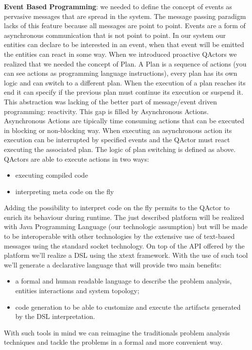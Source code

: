 \textbf{Event Based Programming}: we needed to define the concept of events as pervasive messages that are spread in the system. The message passing paradigm
lacks of this feature because all messages are point to point. Events are a form
of asynchronous communication that is not point to point. In our system our
entities can declare to be interested in an event, when that event will be emitted
the entities can react in some way.
When we introduced proactive QActors we realized that we needed the concept
of Plan. A Plan is a sequence of actions (you can see actions as programming
language instructions), every plan has its own logic and can switch to a different
plan. When the execution of a plan reaches its end it can specify if the
previous plan must continue its execution or suspend it. This abstraction was
lacking of the better part of message/event driven programming: reactivity. This
gap is filled by Asynchronous Actions. Asynchronous Actions are tipically time
consuming actions that can be executed in blocking or non-blocking way. When
executing an asynchronous action its execution can be interrupted by specified
events and the QActor must react executing the associated plan. The logic of
plan switching is defined as above. QActors are able to execute actions in two
ways:
\begin{itemize}
	\item executing compiled code
	\item interpreting meta code on the fly
\end{itemize} 
Adding the possibility to interpret code on the fly permits to the QActor to enrich
its behaviour during runtime. The just described platform will be realized with
Java Programming Language (our technologic assumption) but will be made
to be interoperable with other technologies by the extensive use of text-based
messages using the standard socket technology.
On top of the API offered by the platform we’ll realize a DSL using the xtext
framework. With the use of such tool we’ll generate a declarative language that
will provide two main benefits:
\begin{itemize}
	\item a formal and human readable language to describe the problem analysis,
	entities interactions and system topology;
	\item code generation to be able to customize and execute the artifacts generated by the DSL interpretation.
\end{itemize}
With such tools in mind we can reimagine the traditionals problem analysis
techniques and tackle the problems in a formal and more convenient way.